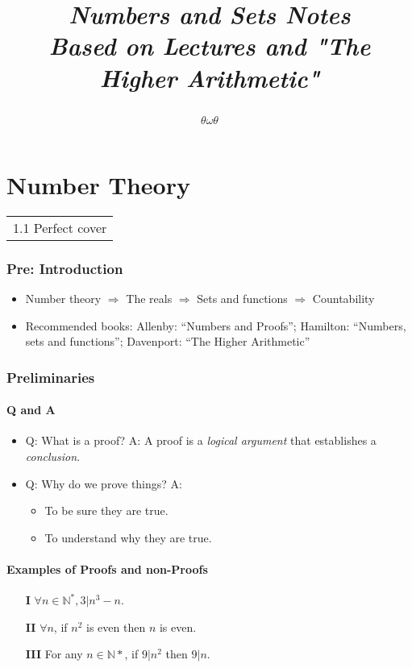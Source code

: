 \documentclass[10pt]{article}
\title{\begin{center}{\Huge \textit{Numbers and Sets Notes}}\\{{\itshape Based on Lectures and "The Higher Arithmetic"}}\end{center}}
\author{$\theta\omega\theta$}
\affiliation{
Not in University of Cambridge\\
skipped some takes irrelevant to contents\\
}
\begin{document}
	\maketitle
	\flushbottom
	\newpage
	\pagestyle{fancynotes}
	\part{Number Theory}
    \begin{margintable}\vspace{.8in}\footnotesize
    	\begin{tabularx}{\marginparwidth}{|X}
    		1.1 Perfect cover
		\end{tabularx}
	\end{margintable}

	\section*{Pre: Introduction}
	\begin{itemize}
		\item Number theory $\Rightarrow$ The reals $\Rightarrow $ Sets and functions $\Rightarrow $ Countability
		\item Recommended books: Allenby: “Numbers and Proofs”; Hamilton: “Numbers, sets and functions”; Davenport: “The Higher Arithmetic” 
	\end{itemize}
	\section{Preliminaries}
	\subsection{Q and A}
		\begin{itemize}
			\item Q: What is a proof?
			A: A proof is a \emph{logical argument} that establishes a \emph{conclusion}.
			\item Q: Why do we prove things?
			A: \begin{itemize}
				\item To be sure they are true.
				\item To understand why they are true.
			\end{itemize}
		\end{itemize}
	\subsection{Examples of Proofs and non-Proofs}
	\begin{enumerate}
		\item[\bf I] $ \forall n\in \mathbb{N}^*, 3|n^3-n $.
		\item[\bf II] $ \forall n $, if $n^2$ is even then $n$ is even.
		\item[\bf III] For any $n\in \mathbb{N}*$, if $9|n^2$ then $9|n$.	 
	\end{enumerate}

\end{document}
